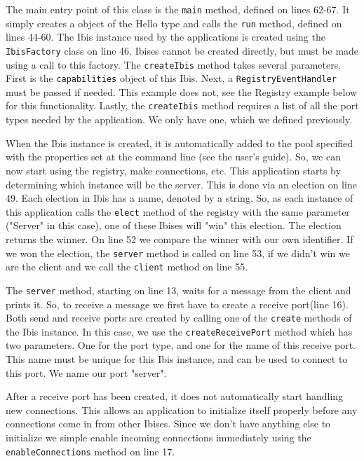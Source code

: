 The main entry point of this class is the \texttt{main} method, defined
on lines 62-67. It simply creates a object of the Hello type and calls
the \texttt{run} method, defined on lines 44-60. The Ibis instance used
by the applications is created using the \texttt{IbisFactory} class on
line 46. Ibises cannot be created directly, but must be made using a
call to this factory. The \texttt{createIbis} method takes several
parameters. First is the \texttt{capabilities} object of this Ibis.
Next, a \texttt{RegistryEventHandler} must be passed if needed. This
example does not, see the Registry example below for this functionality.
Lastly, the \texttt{createIbis} method requires a list of all the port
types needed by the application. We only have one, which we defined
previously.

When the Ibis instance is created, it is automatically added to the pool
specified with the properties set at the command line (see the
user's guide). So, we can now start using the registry, make
connections, etc. This application starts by determining which instance
will be the server. This is done via an election on line 49. Each
election in Ibis has a name, denoted by a string. So, as each instance
of this application calls the \texttt{elect} method of the registry with
the same parameter ("Server" in this case), one of these Ibises will
"win" this election. The election returns the winner. On line 52 we
compare the winner with our own identifier. If we won the election, the
\texttt{server} method is called on line 53, if we didn't win we are the
client and we call the \texttt{client} method on line 55.

The \texttt{server} method, starting on line 13, waits for a message
from the client and prints it. So, to receive a message we first have to
create a receive port(line 16). Both send and receive ports are created
by calling one of the \texttt{create} methods of the Ibis instance. In
this case, we use the \texttt{createReceivePort} method which has two
parameters. One for the port type, and one for the name of this
receive port. This name must be unique for this Ibis instance, and can
be used to connect to this port. We name our port "server".

After a receive port has been created, it does not automatically start
handling new connections. This allows an application to initialize
itself properly before any connections come in from other Ibises. Since
we don't have anything else to initialize we simple enable incoming
connections immediately using the \texttt{enableConnections} method on
line 17.

